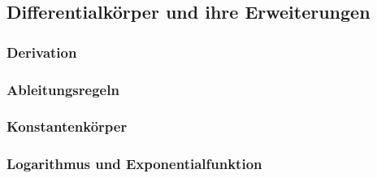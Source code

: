 %
%
%
\subsection{Differentialkörper und ihre Erweiterungen
\label{buch:integral:subsection:diffke}}
%
\subsubsection{Derivation}

\subsubsection{Ableitungsregeln}

\subsubsection{Konstantenkörper}

\subsubsection{Logarithmus und Exponentialfunktion}

